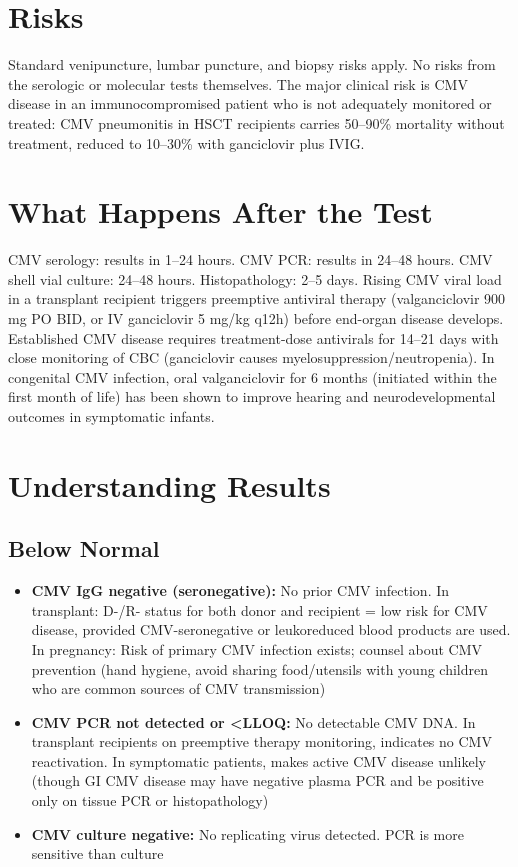 \section*{Risks}
Standard venipuncture, lumbar puncture, and biopsy risks apply. No risks from the serologic or molecular tests themselves. The major clinical risk is CMV disease in an immunocompromised patient who is not adequately monitored or treated: CMV pneumonitis in HSCT recipients carries 50--90\% mortality without treatment, reduced to 10--30\% with ganciclovir plus IVIG.

\section*{What Happens After the Test}
CMV serology: results in 1--24 hours. CMV PCR: results in 24--48 hours. CMV shell vial culture: 24--48 hours. Histopathology: 2--5 days. Rising CMV viral load in a transplant recipient triggers preemptive antiviral therapy (valganciclovir 900 mg PO BID, or IV ganciclovir 5 mg/kg q12h) before end-organ disease develops. Established CMV disease requires treatment-dose antivirals for 14--21 days with close monitoring of CBC (ganciclovir causes myelosuppression/neutropenia). In congenital CMV infection, oral valganciclovir for 6 months (initiated within the first month of life) has been shown to improve hearing and neurodevelopmental outcomes in symptomatic infants.

\section*{Understanding Results}

\subsection*{Below Normal}
\begin{itemize}
  \item \textbf{CMV IgG negative (seronegative):} No prior CMV infection. In transplant: D-/R- status for both donor and recipient = low risk for CMV disease, provided CMV-seronegative or leukoreduced blood products are used. In pregnancy: Risk of primary CMV infection exists; counsel about CMV prevention (hand hygiene, avoid sharing food/utensils with young children who are common sources of CMV transmission)
  \item \textbf{CMV PCR not detected or <LLOQ:} No detectable CMV DNA. In transplant recipients on preemptive therapy monitoring, indicates no CMV reactivation. In symptomatic patients, makes active CMV disease unlikely (though GI CMV disease may have negative plasma PCR and be positive only on tissue PCR or histopathology)
  \item \textbf{CMV culture negative:} No replicating virus detected. PCR is more sensitive than culture
\end{itemize}

